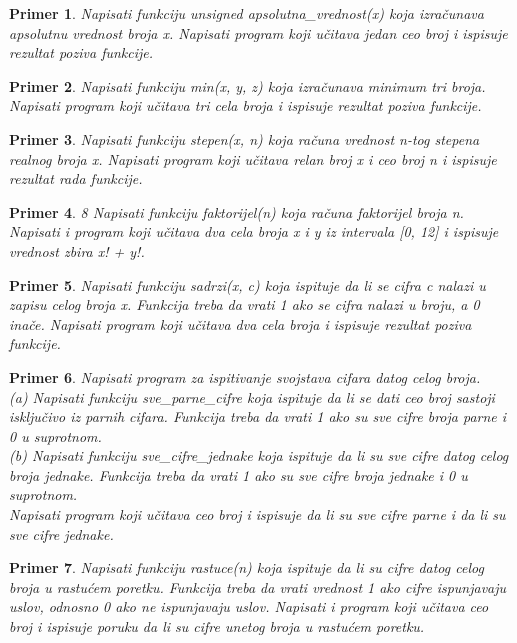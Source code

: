 \documentclass[a4paper]{article}
\newtheorem{primer}{Primer}[section]
\begin{document}
\begin{primer}
Napisati funkciju unsigned apsolutna\_vrednost(x) koja izračunava apsolutnu vrednost broja x. Napisati program koji učitava jedan ceo broj i ispisuje rezultat poziva funkcije.
\end{primer}

\begin{primer}
Napisati funkciju min(x, y, z) koja izračunava minimum tri broja. Napisati program koji učitava tri cela broja i ispisuje rezultat poziva funkcije.
\end{primer}

\begin{primer}
Napisati funkciju stepen(x, n) koja
računa vrednost n-tog stepena realnog broja x. Napisati program koji učitava
relan broj x i ceo broj n i ispisuje rezultat rada funkcije.
\end{primer}

\begin{primer}
8 Napisati funkciju faktorijel(n) koja računa
faktorijel broja n. Napisati i program koji učitava dva cela broja x i y iz intervala
[0, 12] i ispisuje vrednost zbira x! + y!.
\end{primer}

\begin{primer}
Napisati funkciju sadrzi(x, c) koja ispituje
da li se cifra c nalazi u zapisu celog broja x. Funkcija treba da vrati 1 ako se cifra
nalazi u broju, a 0 inače. Napisati program koji učitava dva cela broja i ispisuje
rezultat poziva funkcije.
\end{primer}

\begin{primer}
Napisati program za ispitivanje svojstava cifara datog celog
broja.\\
(a) Napisati funkciju sve\_parne\_cifre koja ispituje da li se dati ceo broj sastoji
isključivo iz parnih cifara. Funkcija treba da vrati 1 ako su sve cifre
broja parne i 0 u suprotnom.\\
(b) Napisati funkciju sve\_cifre\_jednake koja ispituje da li su sve cifre datog
celog broja jednake. Funkcija treba da vrati 1 ako su sve cifre broja jednake
i 0 u suprotnom.\\
Napisati program koji učitava ceo broj i ispisuje da li su sve cifre parne i da li su
sve cifre jednake.
\end{primer}

\begin{primer}
Napisati funkciju rastuce(n) koja ispituje da li
su cifre datog celog broja u rastućem poretku. Funkcija treba da vrati vrednost
1 ako cifre ispunjavaju uslov, odnosno 0 ako ne ispunjavaju uslov. Napisati i
program koji učitava ceo broj i ispisuje poruku da li su cifre unetog broja u
rastućem poretku.
\end{primer}
\end{document}

